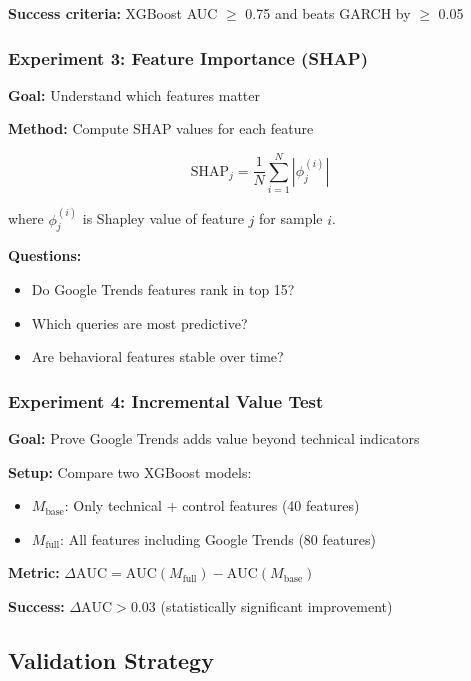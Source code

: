 \documentclass[12pt,a4paper]{article}
\begin{document}
\textbf{Success criteria:} XGBoost AUC $\geq$ 0.75 and beats GARCH by $\geq$ 0.05

\subsubsection{Experiment 3: Feature Importance (SHAP)}

\textbf{Goal:} Understand which features matter

\textbf{Method:} Compute SHAP values for each feature

\begin{equation}
\text{SHAP}_j = \frac{1}{N}\sum_{i=1}^{N} |\phi_j^{(i)}|
\end{equation}

where $\phi_j^{(i)}$ is Shapley value of feature $j$ for sample $i$.

\textbf{Questions:}
\begin{itemize}
    \item Do Google Trends features rank in top 15?
    \item Which queries are most predictive?
    \item Are behavioral features stable over time?
\end{itemize}

\subsubsection{Experiment 4: Incremental Value Test}

\textbf{Goal:} Prove Google Trends adds value beyond technical indicators

\textbf{Setup:} Compare two XGBoost models:
\begin{itemize}
    \item $M_{\text{base}}$: Only technical + control features (40 features)
    \item $M_{\text{full}}$: All features including Google Trends (80 features)
\end{itemize}

\textbf{Metric:} $\Delta\text{AUC} = \text{AUC}(M_{\text{full}}) - \text{AUC}(M_{\text{base}})$

\textbf{Success:} $\Delta\text{AUC} > 0.03$ (statistically significant improvement)

\subsection{Validation Strategy}
\end{document}
